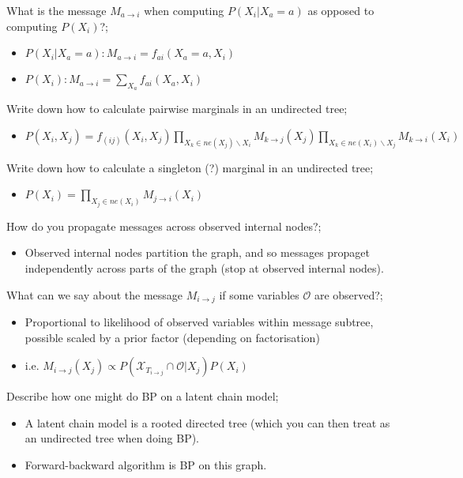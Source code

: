 \documentclass{article}
\begin{document}
What is the message $M_{a\rightarrow i }$ when computing $P(X_i|X_a = a)$ as opposed to computing $P(X_i)$?; \begin{itemize} \item $P(X_i|X_a=a): M_{a\rightarrow i} = f_{ai}(X_a = a, X_i)$ \item $P(X_i): M_{a\rightarrow i} = \sum_{X_a}f_{ai}(X_a, X_i)$ \end{itemize}

Write down how to calculate pairwise marginals in an undirected tree; \begin{itemize} \item $P(X_i, X_j) = f_{(ij)}(X_i, X_j)\prod_{X_k\in ne(X_j)\backslash X_i}M_{k\rightarrow j}(X_j)\prod_{X_k\in ne(X_i)\backslash X_j}M_{k\rightarrow i}(X_i)$ \end{itemize} 

Write down how to calculate a singleton (?) marginal in an undirected tree; \begin{itemize} \item $P(X_i) = \prod_{X_j\in ne(X_i)}M_{j\rightarrow i}(X_i)$ \end{itemize}

How do you propagate messages across observed internal nodes?; \begin{itemize} \item Observed internal nodes partition the graph, and so messages propaget independently across parts of the graph (stop at observed internal nodes).  \end{itemize}

What can we say about the message $M_{i\rightarrow j}$ if some variables $\mathcal{O}$ are observed?; \begin{itemize} \item Proportional to likelihood of observed variables within message subtree, possible scaled by a prior factor (depending on factorisation) \item i.e. $M_{i\rightarrow j}(X_j) \propto P(\mathcal{X}_{T_{i\rightarrow j}}\cap \mathcal{O}|X_j)P(X_i)$ \end{itemize}

Describe how one might do BP on a latent chain model; \begin{itemize} \item A latent chain model is a rooted directed tree (which you can then treat as an undirected tree when doing BP).  \item Forward-backward algorithm is BP on this graph.  \end{itemize}
\end{document}
